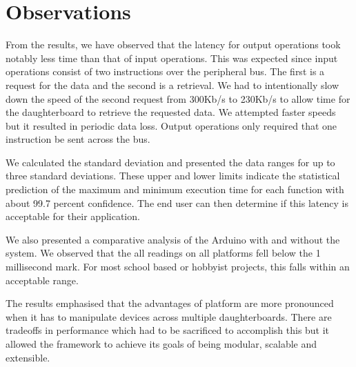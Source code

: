 

\section{Observations} %
\label{sec:Observations}

From the results, we have observed that the latency for output operations took notably less time than that of input operations. This was expected since input operations consist of two instructions over the peripheral bus. The first is a request for the data and the second is a retrieval. We had to intentionally slow down the speed of the second request from 300Kb/s to 230Kb/s to allow time for the daughterboard to retrieve the requested data. We attempted faster speeds but it resulted in periodic data loss. Output operations only required that one instruction be sent across the bus.

We calculated the standard deviation and presented the data ranges for up to three standard deviations. These upper and lower limits indicate the statistical prediction of the maximum and minimum execution time for each function with about 99.7 percent confidence. The end user can then determine if this latency is acceptable for their application.

We also presented a comparative analysis of the Arduino with and without the \xten system. We observed that the all readings on all platforms fell below the 1 millisecond mark. For most school based or hobbyist projects, this falls within an acceptable range.

The results emphasised that the advantages of \xten platform are more pronounced when it has to manipulate devices across multiple daughterboards. There are tradeoffs in performance which had to be sacrificed to accomplish this but it allowed the framework to achieve its goals of being modular, scalable and extensible.
